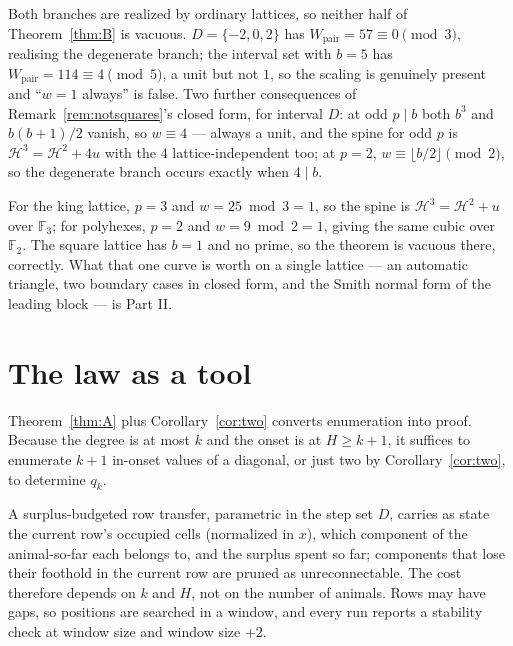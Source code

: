 \documentclass[11pt]{article}
\newcommand{\Wp}{W_{\mathrm{pair}}}
\newcommand{\F}{\mathbb{F}}
\begin{document}
\begin{remark}
Both branches are realized by ordinary lattices, so neither half of
Theorem~\ref{thm:B} is vacuous. $D = \{-2,0,2\}$ has $\Wp = 57 \equiv 0 \pmod 3$,
realising the degenerate branch; the interval set with $b = 5$ has
$\Wp = 114 \equiv 4 \pmod 5$, a unit but not $1$, so the scaling is genuinely
present and ``$w = 1$ always'' is false. Two further consequences of
Remark~\ref{rem:notsquares}'s closed form, for interval $D$: at odd $p \mid b$
both $b^3$ and $b(b+1)/2$ vanish, so $w \equiv 4$ --- always a unit, and the
spine for odd $p$ is $\mathcal H^3 = \mathcal H^2 + 4u$ with the $4$
lattice-independent too; at $p = 2$, $w \equiv \lfloor b/2 \rfloor \pmod 2$, so
the degenerate branch occurs exactly when $4 \mid b$.
\end{remark}

For the king lattice, $p = 3$ and $w = 25 \bmod 3 = 1$, so the spine is
$\mathcal H^3 = \mathcal H^2 + u$ over $\F_3$; for polyhexes, $p = 2$ and
$w = 9 \bmod 2 = 1$, giving the same cubic over $\F_2$. The square lattice has
$b = 1$ and no prime, so the theorem is vacuous there, correctly. What that one curve
is worth on a single lattice --- an automatic triangle, two boundary cases in
closed form, and the Smith normal form of the leading block --- is Part II.

\section{The law as a tool}
\label{sec:machine}

Theorem~\ref{thm:A} plus Corollary~\ref{cor:two} converts enumeration into proof.
Because the degree is at most $k$ and the onset is at $H \ge k+1$, it suffices to
enumerate $k+1$ in-onset values of a diagonal, or just two by
Corollary~\ref{cor:two}, to determine $q_k$.

A surplus-budgeted row transfer, parametric in the
step set $D$, carries as state the current row's occupied cells (normalized in
$x$), which component of the animal-so-far each belongs to, and the surplus spent
so far; components that lose their foothold in the current row are pruned as
unreconnectable. The cost therefore depends on $k$ and $H$, not on the number of
animals. Rows may have gaps, so positions are searched in a window, and every run
reports a stability check at window size and window size $+2$.
\end{document}
